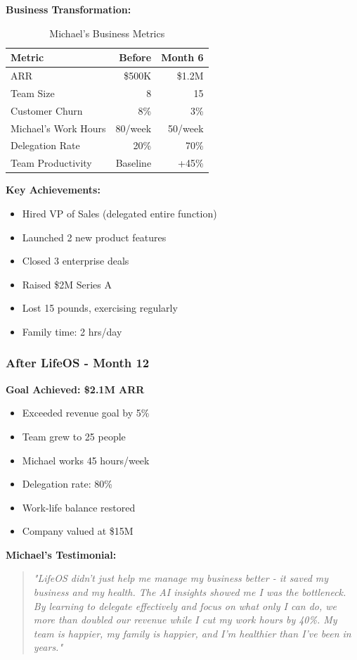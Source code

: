 \textbf{Business Transformation:}

\begin{table}[H]
\centering
\caption{Michael's Business Metrics}
\begin{tabular}{|l|r|r|}
\hline
\rowcolor{lightgray}
\textbf{Metric} & \textbf{Before} & \textbf{Month 6} \\
\hline
ARR & \$500K & \$1.2M \\
\hline
Team Size & 8 & 15 \\
\hline
Customer Churn & 8\% & 3\% \\
\hline
Michael's Work Hours & 80/week & 50/week \\
\hline
Delegation Rate & 20\% & 70\% \\
\hline
Team Productivity & Baseline & +45\% \\
\hline
\end{tabular}
\end{table}

\textbf{Key Achievements:}
\begin{itemize}
    \item Hired VP of Sales (delegated entire function)
    \item Launched 2 new product features
    \item Closed 3 enterprise deals
    \item Raised \$2M Series A
    \item Lost 15 pounds, exercising regularly
    \item Family time: 2 hrs/day
\end{itemize}

\subsubsection{After LifeOS - Month 12}

\textbf{Goal Achieved: \$2.1M ARR}

\begin{itemize}
    \item Exceeded revenue goal by 5\%
    \item Team grew to 25 people
    \item Michael works 45 hours/week
    \item Delegation rate: 80\%
    \item Work-life balance restored
    \item Company valued at \$15M
\end{itemize}

\textbf{Michael's Testimonial:}
\begin{quote}
\textit{"LifeOS didn't just help me manage my business better - it saved my business and my health. The AI insights showed me I was the bottleneck. By learning to delegate effectively and focus on what only I can do, we more than doubled our revenue while I cut my work hours by 40\%. My team is happier, my family is happier, and I'm healthier than I've been in years."}
\end{quote}


